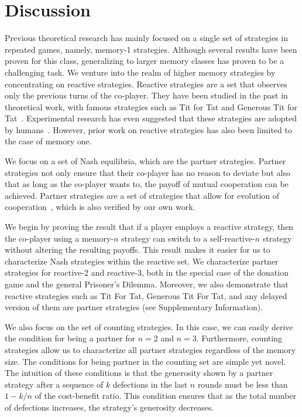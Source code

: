 \documentclass[11pt]{article}
\begin{document}
\section*{Discussion}

Previous theoretical research has mainly focused on a single set of strategies
in repeated games, namely, memory-1 strategies. Although several results have
been proven for this class, generalizing to larger memory classes has proven to
be a challenging task. We venture into the realm of higher memory strategies by
concentrating on reactive strategies. Reactive strategies are a set that
observes only the previous turns of the co-player. They have been studied in the
past in theoretical work, with famous strategies such as Tit for Tat and
Generous Tit for Tat~\cite{nowak:Nature:1993}. Experimental research has even
suggested that these strategies are adopted by humans~\cite{engle:ET:2006,
bruttel:TD:2012}. However, prior work on reactive strategies has also been
limited to the case of memory one.

We focus on a set of Nash equilibria, which are the partner strategies. Partner
strategies not only ensure that their co-player has no reason to deviate but
also that as long as the co-player wants to, the payoff of mutual cooperation
can be achieved. Partner strategies are a set of strategies that
allow for evolution of cooperation~\cite{hilbe:Nature:2018},
which is also verified by our own work.

We begin by proving the result that if a player employs a reactive strategy,
then the co-player using a memory-$n$ strategy can switch to a self-reactive-$n$
strategy without altering the resulting payoffs. This result makes it easier for
us to characterize Nash strategies within the reactive set. We characterize
partner strategies for reactive-2 and reactive-3, both in the special case of
the donation game and the general Prisoner's Dilemma. Moreover, we also
demonstrate that reactive strategies such as Tit For Tat, Generous Tit For Tat,
and any delayed version of them are partner strategies (see Supplementary
Information).

We also focus on the set of counting strategies. In this case, we can easily
derive the condition for being a partner for $n=2$ and $n=3$. Furthermore,
counting strategies allow us to characterize all partner strategies regardless
of the memory size. The conditions for being partner in the counting set are
simple yet novel. The intuition of these conditions is that the generosity shown
by a partner strategy after a sequence of $k$ defections in the last $n$ rounds
must be less than $1 - k/n$ of the cost-benefit ratio. This condition ensures
that as the total number of defections increases, the strategy's generosity
decreases.
\end{document}
